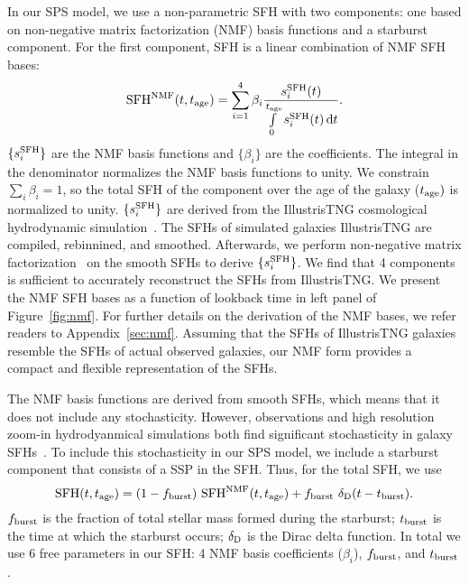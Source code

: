 In our SPS model, we use a non-parametric SFH with two components: one based on
non-negative matrix factorization (NMF) basis functions and a starburst component.
For the first component, SFH is a linear combination of NMF SFH bases:
\begin{equation} \label{eq:nmf} 
    {\rm SFH}^{\rm NMF} (t, t_{\rm age}) = \sum\limits_{i=1}^{4} \beta_i
    \frac{s_i^{\rm SFH}(t)}{\int\limits_0^{t_{\rm age}} s_i^{\rm SFH}(t) \,
    {\rm d}t}. 
\end{equation} 
$\{s^{\rm SFH}_i\}$ are the NMF basis functions and $\{\beta_i\}$ are the
coefficients. 
The integral in the denominator normalizes the NMF basis functions to unity. 
We constrain $\sum_i \beta_i = 1$, so the total SFH of the component over the
age of the galaxy ($t_{\rm age})$ is normalized to unity.
$\{s^{\rm SFH}_i\}$ are derived from the IllustrisTNG cosmological hydrodynamic
simulation~\citep{nelson2018, pillepich2018, springel2018}.
The SFHs of simulated galaxies IllustrisTNG are compiled, rebinnined, and
smoothed.
Afterwards, we perform non-negative matrix
factorization~\citep{lee1999,cichocki2009, fevotte2011} on the smooth SFHs to
derive $\{s^{\rm SFH}_i\}$. 
We find that 4 components is sufficient to accurately reconstruct the SFHs
from IllustrisTNG. 
We present the NMF SFH bases as a function of lookback time in
left panel of Figure~\ref{fig:nmf}.
For further details on the derivation of the NMF bases, we refer readers to
Appendix~\ref{sec:nmf}. 
Assuming that the SFHs of IllustrisTNG galaxies resemble the SFHs of actual
observed galaxies, our NMF form provides a compact and flexible representation
of the SFHs. 

The NMF basis functions are derived from smooth SFHs, which means that it does
not include any stochasticity. 
However, observations and high resolution zoom-in hydrodyanmical simulations
both find significant stochasticity in galaxy SFHs~\citep{sparre2017,
caplar2019, hahn2019b, iyer2020}. 
To include this stochasticity in our SPS model, we include a starburst
component that consists of a SSP in the SFH. 
Thus, for the total SFH, we use
\begin{equation} \label{eq:sfh}
    {\rm SFH} (t, t_{\rm age}) = (1 - f_{\rm burst})~{\rm SFH}^{\rm NMF} (t,
    t_{\rm age}) + f_{\rm burst}~\delta_{\rm D}(t - t_{\rm burst}).
\end{equation}
$f_{\rm burst}$ is the fraction of total stellar mass formed during the
starburst; $t_{\rm burst}$ is the time at which the starburst occurs; 
$\delta_{\rm D}$ is the Dirac delta function.
In total we use 6 free parameters in our SFH: 4 NMF basis coefficients 
($\beta_i$), $f_{\rm burst}$, and $t_{\rm burst}$. 

